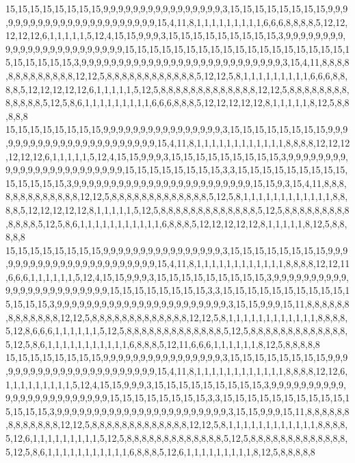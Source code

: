 15,15,15,15,15,15,15,15,9,9,9,9,9,9,9,9,9,9,9,9,9,9,9,9,3,15,15,15,15,15,15,15,15,9,9,9,9,9,9,9,9,9,9,9,9,9,9,9,9,9,9,9,9,9,9,9,15,4,11,8,1,1,1,1,1,1,1,1,1,6,6,6,8,8,8,8,5,12,12,12,12,12,6,1,1,1,1,1,5,12,4,15,15,9,9,9,3,15,15,15,15,15,15,15,15,15,3,9,9,9,9,9,9,9,9,9,9,9,9,9,9,9,9,9,9,9,9,9,9,9,9,15,15,15,15,15,15,15,15,15,15,15,15,15,15,15,15,15,15,15,15,15,15,15,15,3,9,9,9,9,9,9,9,9,9,9,9,9,9,9,9,9,9,9,9,9,9,9,9,9,9,9,9,3,15,4,11,8,8,8,8,8,8,8,8,8,8,8,8,8,12,12,5,8,8,8,8,8,8,8,8,8,8,8,8,5,12,12,5,8,1,1,1,1,1,1,1,1,1,6,6,6,8,8,8,8,5,12,12,12,12,12,6,1,1,1,1,1,5,12,5,8,8,8,8,8,8,8,8,8,8,8,8,8,12,12,5,8,8,8,8,8,8,8,8,8,8,8,8,8,5,12,5,8,6,1,1,1,1,1,1,1,1,1,6,6,6,8,8,8,5,12,12,12,12,12,8,1,1,1,1,1,8,12,5,8,8,8,8,8
15,15,15,15,15,15,15,15,9,9,9,9,9,9,9,9,9,9,9,9,9,9,9,9,3,15,15,15,15,15,15,15,15,9,9,9,9,9,9,9,9,9,9,9,9,9,9,9,9,9,9,9,9,9,9,9,15,4,11,8,1,1,1,1,1,1,1,1,1,1,1,1,8,8,8,8,12,12,12,12,12,12,6,1,1,1,1,1,5,12,4,15,15,9,9,9,3,15,15,15,15,15,15,15,15,15,3,9,9,9,9,9,9,9,9,9,9,9,9,9,9,9,9,9,9,9,9,9,9,9,9,15,15,15,15,15,15,15,15,3,3,15,15,15,15,15,15,15,15,15,15,15,15,15,15,3,9,9,9,9,9,9,9,9,9,9,9,9,9,9,9,9,9,9,9,9,9,9,9,9,15,15,9,3,15,4,11,8,8,8,8,8,8,8,8,8,8,8,8,8,12,12,5,8,8,8,8,8,8,8,8,8,8,8,8,8,5,12,5,8,1,1,1,1,1,1,1,1,1,1,1,1,8,8,8,8,5,12,12,12,12,12,8,1,1,1,1,1,5,12,5,8,8,8,8,8,8,8,8,8,8,8,8,8,5,12,5,8,8,8,8,8,8,8,8,8,8,8,8,8,5,12,5,8,6,1,1,1,1,1,1,1,1,1,1,1,6,8,8,8,5,12,12,12,12,12,8,1,1,1,1,1,8,12,5,8,8,8,8,8
15,15,15,15,15,15,15,15,9,9,9,9,9,9,9,9,9,9,9,9,9,9,9,9,3,15,15,15,15,15,15,15,15,9,9,9,9,9,9,9,9,9,9,9,9,9,9,9,9,9,9,9,9,9,9,9,15,4,11,8,1,1,1,1,1,1,1,1,1,1,1,1,8,8,8,8,12,12,11,6,6,6,1,1,1,1,1,1,5,12,4,15,15,9,9,9,3,15,15,15,15,15,15,15,15,15,3,9,9,9,9,9,9,9,9,9,9,9,9,9,9,9,9,9,9,9,9,9,9,9,9,15,15,15,15,15,15,15,15,3,3,15,15,15,15,15,15,15,15,15,15,15,15,15,15,3,9,9,9,9,9,9,9,9,9,9,9,9,9,9,9,9,9,9,9,9,9,9,9,3,15,15,9,9,9,15,11,8,8,8,8,8,8,8,8,8,8,8,8,8,12,12,5,8,8,8,8,8,8,8,8,8,8,8,8,8,12,12,5,8,1,1,1,1,1,1,1,1,1,1,1,1,8,8,8,8,5,12,8,6,6,6,1,1,1,1,1,1,5,12,5,8,8,8,8,8,8,8,8,8,8,8,8,8,5,12,5,8,8,8,8,8,8,8,8,8,8,8,8,8,5,12,5,8,6,1,1,1,1,1,1,1,1,1,1,1,6,8,8,8,5,12,11,6,6,6,1,1,1,1,1,1,8,12,5,8,8,8,8,8
15,15,15,15,15,15,15,15,9,9,9,9,9,9,9,9,9,9,9,9,9,9,9,9,3,15,15,15,15,15,15,15,15,9,9,9,9,9,9,9,9,9,9,9,9,9,9,9,9,9,9,9,9,9,9,9,15,4,11,8,1,1,1,1,1,1,1,1,1,1,1,1,8,8,8,8,12,12,6,1,1,1,1,1,1,1,1,1,5,12,4,15,15,9,9,9,3,15,15,15,15,15,15,15,15,15,3,9,9,9,9,9,9,9,9,9,9,9,9,9,9,9,9,9,9,9,9,9,9,9,9,15,15,15,15,15,15,15,15,3,3,15,15,15,15,15,15,15,15,15,15,15,15,15,15,3,9,9,9,9,9,9,9,9,9,9,9,9,9,9,9,9,9,9,9,9,9,9,9,3,15,15,9,9,9,15,11,8,8,8,8,8,8,8,8,8,8,8,8,8,12,12,5,8,8,8,8,8,8,8,8,8,8,8,8,8,12,12,5,8,1,1,1,1,1,1,1,1,1,1,1,1,8,8,8,8,5,12,6,1,1,1,1,1,1,1,1,1,5,12,5,8,8,8,8,8,8,8,8,8,8,8,8,8,5,12,5,8,8,8,8,8,8,8,8,8,8,8,8,8,5,12,5,8,6,1,1,1,1,1,1,1,1,1,1,1,6,8,8,8,5,12,6,1,1,1,1,1,1,1,1,1,8,12,5,8,8,8,8,8

